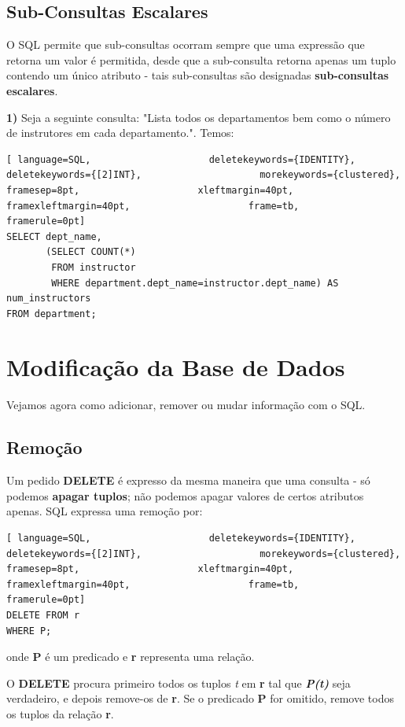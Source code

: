 \documentclass[oneside]{book}
\theoremstyle{definition}
\begin{document}
\subsection{Sub-Consultas Escalares}
O SQL permite que sub-consultas ocorram sempre que uma expressão que retorna um valor é permitida, desde que a sub-consulta retorna apenas um tuplo contendo um único atributo - tais sub-consultas são designadas \textbf{sub-consultas escalares}.

\textbf{1)} Seja a seguinte consulta: "Lista todos os departamentos bem como o número de instrutores em cada departamento.". Temos:
\begin{lstlisting}[ language=SQL,                     deletekeywords={IDENTITY},                     deletekeywords={[2]INT},                     morekeywords={clustered},                     framesep=8pt,                     xleftmargin=40pt,                     framexleftmargin=40pt,                     frame=tb,                     framerule=0pt]
SELECT dept_name, 
       (SELECT COUNT(*)
        FROM instructor
        WHERE department.dept_name=instructor.dept_name) AS num_instructors
FROM department;
\end{lstlisting}

\section{Modificação da Base de Dados}
Vejamos agora como adicionar, remover ou mudar informação com o SQL.

\subsection{Remoção}
Um pedido \textbf{DELETE} é expresso da mesma maneira que uma consulta - só podemos \textbf{apagar tuplos}; não podemos apagar valores de certos atributos apenas. SQL expressa uma remoção por:

\begin{lstlisting}[ language=SQL,                     deletekeywords={IDENTITY},                     deletekeywords={[2]INT},                     morekeywords={clustered},                     framesep=8pt,                     xleftmargin=40pt,                     framexleftmargin=40pt,                     frame=tb,                     framerule=0pt]
DELETE FROM r
WHERE P;
\end{lstlisting}
onde \textbf{P} é um predicado e \textbf{r} representa uma relação.

O \textbf{DELETE} procura primeiro todos os tuplos \textit{t} em \textbf{r} tal que \textbf{\textit{P(t)}} seja verdadeiro, e depois remove-os de \textbf{r}. Se o predicado \textbf{P} for omitido, remove todos os tuplos da relação \textbf{r}.
\end{document}
